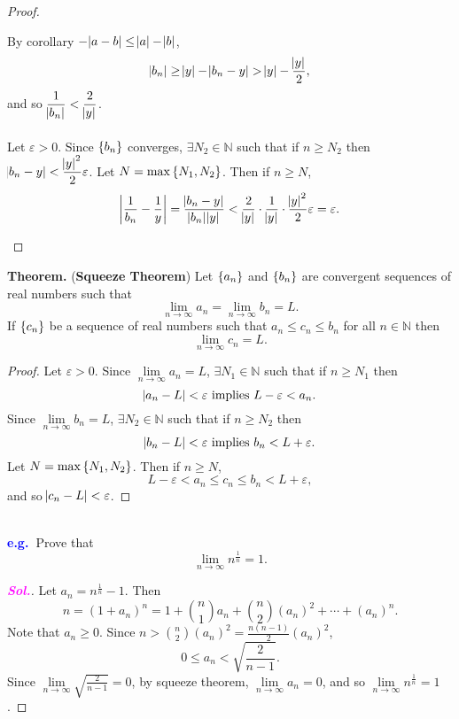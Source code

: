 \documentclass[12pt,a4paper]{article}
\newcommand{\dispsty}{\displaystyle}
\newcommand{\sol}{\textcolor{magenta}{\bf \textit{Sol.}}\quad}
\newcommand{\eg}{\textcolor{blue}{\bf e.g.\ \quad }}
\begin{document}
\begin{tcolorbox}[colback=white]
\begin{proof}
\begin{itemize}
		By corollary $-\abs{a-b}\leq \abs{a}-\abs{b}$, \[
		\abs{b_n}\geq\abs{y}-\abs{b_n-y}>\abs{y}-\frac{\abs{y}}{2},
		\] and so $\dispsty\frac{1}{\abs{b_n}}<\frac{2}{\abs{y}}$.\\
		\\
		Let $\varepsilon>0$. Since $\set{b_n}$ converges, $\exists N_2\in\mathbb{N}$ such that if $n\geq N_2$ then $\abs{b_n-y}<\dispsty\frac{\abs{y}^2}{2}\varepsilon$. Let $N=\max\set{N_1,N_2}$. Then if $n\geq N$, \[
		\abs{\frac{1}{b_n}-\frac{1}{y}}=\frac{\abs{b_n-y}}{\abs{b_n}\abs{y}}<\frac{2}{\abs{y}}\cdot\frac{1}{\abs{y}}\cdot\frac{\abs{y}^2}{2}\varepsilon=\varepsilon.
		\]
	\end{itemize}
\end{proof}
\end{tcolorbox}
	
\begin{tcolorbox}[colback=white]
	\textbf{Theorem.} (\textbf{Squeeze Theorem}) Let $\set{a_n}$ and $\set{b_n}$ are convergent sequences of real numbers such that \[
	\lim\limits_{n\to\infty}a_n=\lim\limits_{n\to\infty}b_n=L.
	\] If $\set{c_n}$ be a sequence of real numbers such that $a_n\leq c_n\leq b_n$ for all $n\in\mathbb{N}$ then \[
	\lim\limits_{n\to\infty}c_n=L.
	\]\tcblower\begin{proof}
		Let $\varepsilon>0$. Since $\lim\limits_{n\to\infty}a_n=L$, $\exists N_1\in\mathbb{N}$ such that if $n\geq N_1$ then \[
		\abs{a_n-L}<\varepsilon\ \text{implies}\ L-\varepsilon<a_n.
		\] Since $\lim\limits_{n\to\infty}b_n=L$, $\exists N_2\in\mathbb{N}$ such that if $n\geq N_2$ then \[
		\abs{b_n-L}<\varepsilon\ \text{implies}\ b_n<L+\varepsilon.
		\] Let $N=\max\set{N_1,N_2}$. Then if $n\geq N$, \[
		L-\varepsilon<a_n\leq c_n\leq b_n<L+\varepsilon,
		\] and so $\abs{c_n-L}<\varepsilon$.
	\end{proof}
\end{tcolorbox}\
\\
\eg Prove that \[
\lim\limits_{n\to\infty}n^{\frac{1}{n}}=1.
\]\begin{proof}[\sol]
	Let $a_n=n^{\frac{1}{n}}-1$. Then \[
	n=(1+a_n)^n=1+\binom{n}{1}a_n+\binom{n}{2}(a_n)^2+\cdots+(a_n)^n.
	\] Note that $a_n\geq 0$. Since $\dispsty n>\binom{n}{2}(a_n)^2=\frac{n(n-1)}{2}(a_n)^2$, \[
	0\leq a_n<\sqrt{\frac{2}{n-1}}.
	\] Since $\dispsty\lim\limits_{n\to\infty}\sqrt{\frac{2}{n-1}}=0$, by squeeze theorem, $\lim\limits_{n\to\infty}a_n=0$, and so $\dispsty\lim\limits_{n\to\infty}n^{\frac{1}{n}}=1$.
\end{proof}

\newpage
\end{document}

